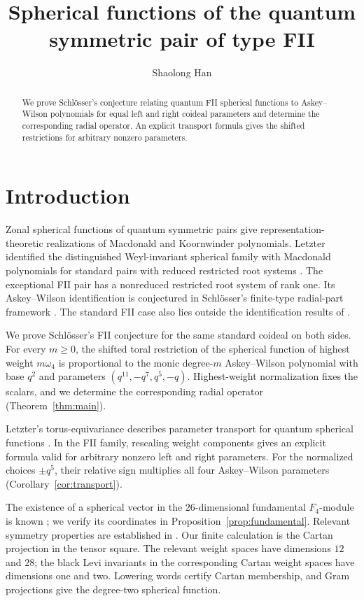 \documentclass[12pt,reqno]{amsart}
\title[Spherical functions of type FII]{Spherical functions of the quantum symmetric pair of type FII}
\author{Shaolong Han}
\theoremstyle{plain}
\theoremstyle{definition}
\numberwithin{equation}{section}
\begin{document}
\begin{abstract}
We prove Schl\"osser's conjecture relating quantum FII spherical functions to Askey--Wilson polynomials for equal left and right coideal parameters and determine the corresponding radial operator.
An explicit transport formula gives the shifted restrictions for arbitrary nonzero parameters.
\end{abstract}
\maketitle

\section{Introduction}

Zonal spherical functions of quantum symmetric pairs give
representation-theoretic realizations of Macdonald and Koornwinder
polynomials. Letzter identified the distinguished Weyl-invariant
spherical family with Macdonald polynomials for standard pairs
with reduced restricted root systems \cite{Let04}.
The exceptional FII pair has a nonreduced restricted root system
of rank one. Its Askey--Wilson identification is conjectured
in Schl\"osser's finite-type radial-part framework \cite{Sch26}.
The standard FII case also lies outside the identification
results of \cite{MS26}.

We prove Schl\"osser's FII conjecture for the same standard
coideal on both sides.
For every $m\geq0$, the shifted toral restriction of the spherical
function of highest weight $m\omega_4$ is proportional to the
monic degree-$m$ Askey--Wilson polynomial with base $q^2$ and
parameters $(q^{11},-q^7,q^5,-q)$.
Highest-weight normalization fixes the scalars, and we determine
the corresponding radial operator (Theorem~\ref{thm:main}).

Letzter's torus-equivariance describes parameter transport for
quantum spherical functions \cite{Let03}.
In the FII family, rescaling weight components gives an explicit
formula valid for arbitrary nonzero left and right parameters.
For the normalized choices $\pm q^5$, their relative sign multiplies
all four Askey--Wilson parameters (Corollary~\ref{cor:transport}).

The existence of a spherical vector in the $26$-dimensional
fundamental $F_4$-module is known \cite{Wat23}; we verify its
coordinates in Proposition~\ref{prop:fundamental}.
Relevant symmetry properties are established in \cite{Mee26}.
Our finite calculation is the Cartan projection in the tensor
square. The relevant weight spaces have dimensions $12$ and $28$;
the black Levi invariants in the corresponding Cartan weight
spaces have dimensions one and two.
Lowering words certify Cartan membership, and Gram projections
give the degree-two spherical function.
\end{document}

